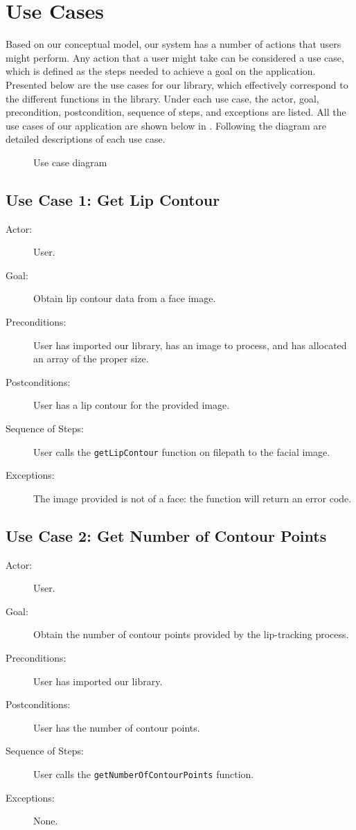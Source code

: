 \chapter{Use Cases}
Based on our conceptual model, our system has a number of actions that users might perform. Any action that a user might take can be considered a use case, which is defined as the steps needed to achieve a goal on the application. Presented below are the use cases for our library, which effectively correspond to the different functions in the library. Under each use case, the actor, goal, precondition, postcondition, sequence of steps, and exceptions are listed. All the use cases of our application are shown below in . Following the diagram are detailed descriptions of each use case.

\begin{figure}[!h]
	\noindent\centering\resizebox{0.8\textwidth}{!}{
		
	}
	\caption{Use case diagram}
	\label{fig:use-cases}
\end{figure}

\section{Use Case 1: Get Lip Contour}

\begin{description}
  \item[Actor:] User.
  \item[Goal:] Obtain lip contour data from a face image.
  \item[Preconditions:] User has imported our library, has an image to process, and has allocated an array of the proper size.
  \item[Postconditions:] User has a lip contour for the provided image.
  \item[Sequence of Steps:] User calls the \texttt{getLipContour} function on filepath to the facial image.
  \item[Exceptions:] The image provided is not of a face: the function will return an error code.
\end{description}


\section{Use Case 2: Get Number of Contour Points}

\begin{description}
	\item[Actor:] User.
	\item[Goal:] Obtain the number of contour points provided by the lip-tracking process.
	\item[Preconditions:] User has imported our library.
	\item[Postconditions:] User has the number of contour points.
	\item[Sequence of Steps:] User calls the \texttt{getNumberOfContourPoints} function.
	\item[Exceptions:] None.
\end{description}


